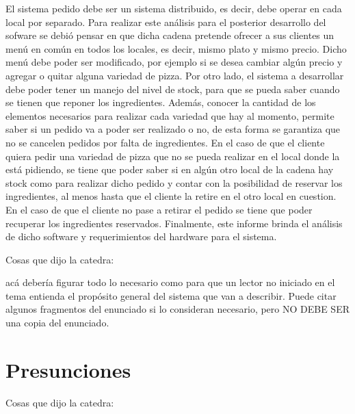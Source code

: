 \documentclass[a4paper,10pt]{article}
\begin{document}
El sistema pedido debe ser un sistema distribuido, es decir, debe operar en cada local por separado. Para realizar este an\'alisis para el posterior desarrollo del sofware se debi\'o pensar en que dicha cadena pretende ofrecer a sus clientes un men\'u en com\'un en todos los locales, es decir, mismo plato y mismo precio. Dicho men\'u debe poder ser modificado, por ejemplo si se desea cambiar alg\'un precio y agregar o quitar alguna variedad de pizza. Por otro lado, el sistema a desarrollar debe poder tener un manejo del nivel de stock, para que se pueda saber cuando se tienen que reponer los ingredientes. Adem\'as, conocer la cantidad de los elementos necesarios para realizar cada variedad que hay al momento, permite saber si un pedido va a poder ser realizado o no, de esta forma se garantiza que no se cancelen pedidos por falta de ingredientes. En el caso de que el cliente quiera pedir una variedad de pizza que no se pueda realizar en el local donde la est\'a pidiendo, se tiene que poder saber si en alg\'un otro local de la cadena hay stock como para realizar dicho pedido y contar con la posibilidad de reservar los ingredientes, al menos hasta que el cliente la retire en el otro local en cuestion. En el caso de que el cliente no pase a retirar el pedido se tiene que poder recuperar los ingredientes reservados. Finalmente, este informe brinda el an\'alisis de dicho software y requerimientos del hardware para el sistema.



Cosas que dijo la catedra:

acá debería figurar todo lo necesario como para que un
lector no iniciado en el tema entienda el propósito general del
sistema que van a describir. Puede citar algunos fragmentos del
enunciado si lo consideran necesario, pero NO DEBE SER una copia del
enunciado.

\newpage
\section*{Presunciones}

Cosas que dijo la catedra:
\end{document}
